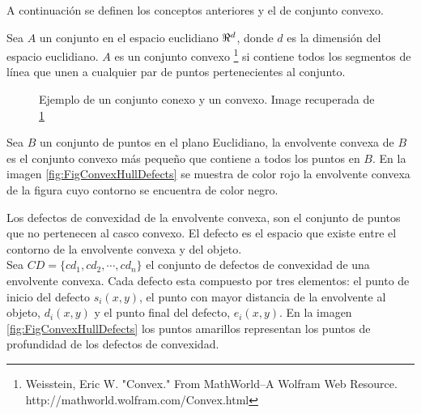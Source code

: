A continuación se definen los conceptos anteriores y el de conjunto convexo.

Sea $A$ un conjunto en el espacio euclidiano $\bold{\Re}^d$, donde $d$ es la dimensión del espacio euclidiano. $A$ es un conjunto convexo \footnote{\label{ConvexFN} Weisstein, Eric W. "Convex." From MathWorld--A Wolfram Web Resource. http://mathworld.wolfram.com/Convex.html} si contiene todos los segmentos de línea que unen a cualquier par de puntos pertenecientes al conjunto.  
\begin{figure}[h!]
\centering
{} \hspace{10mm}
 \hspace{10mm}
\caption{Ejemplo de un conjunto conexo y un convexo. Image recuperada de \ref{ConvexFN} }\label{fig:Sets}
\end{figure} 

Sea $B$ un conjunto de puntos en el plano Euclidiano, la envolvente convexa de $B$ es el conjunto convexo más pequeño que contiene a todos los puntos en $B$. En la imagen \ref{fig:FigConvexHullDefects} se muestra de color rojo la envolvente convexa de la figura cuyo contorno se encuentra de color negro. 

Los defectos de convexidad de la envolvente convexa, son el conjunto de puntos que no pertenecen al casco convexo. El defecto es el espacio que existe entre el contorno de la envolvente convexa y del objeto.\\
Sea $CD=\lbrace cd_1, cd_2, \cdots, cd_n \rbrace$ el conjunto de defectos de convexidad de una envolvente convexa. Cada defecto esta compuesto por tres elementos: el punto de inicio del defecto $s_i(x,y)$, el punto con mayor distancia de la envolvente al objeto, $d_i(x,y)$ y el punto final del defecto, $e_i(x,y)$.
En la imagen \ref{fig:FigConvexHullDefects} los puntos amarillos representan los puntos de profundidad de los defectos de convexidad. 

